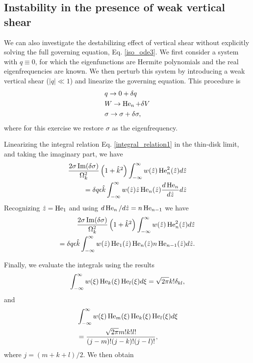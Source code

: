 \subsection{Instability in the presence of weak vertical shear}
We can also investigate the destabilizing effect of vertical shear
without explicitly solving the full governing equation,
Eq. \ref{iso_ode3}. We first
consider a system with $q\equiv0$, for which the eigenfunctions are
Hermite polynomials and the real eigenfrequencies are known. We then
perturb this system by introducing a weak vertical shear ($|q|\ll1$)
and linearize the governing equation. This procedure is
\begin{align}   
  &q \to 0 + \delta q\\
  &W \to \operatorname{He}_n + \delta V \\
  &\sigma \to \sigma + \delta\sigma, 
\end{align}
where for this exercise we restore $\sigma$ as the eigenfrequency. 

Linearizing the integral relation Eq. \ref{integral_relation1} in the
thin-disk limit, and taking the
imaginary part, we have
\begin{align}
  \frac{2\sigma\operatorname{Im}(\delta\sigma)}{\Omega_k^2}
  \left(1+\hat{k}^2\right) \int_{-\infty}^{\infty} w(\hat{z})
  \operatorname{He}_n^2(\hat{z}) d\hat{z} \notag\\
  = \delta q \epsilon \hat{k} 
  \int_{-\infty}^{\infty}
  w(\hat{z})\hat{z}\operatorname{He}_n(\hat{z})\frac{d\operatorname{He}_n}{d\hat{z}} d\hat{z}
\end{align}
Recognizing $\hat{z} = \operatorname{He}_1$ and using $d\operatorname{He}_n/d\hat{z} = n
\operatorname{He}_{n-1}$ we have
 \begin{align}
   \frac{2\sigma\operatorname{Im}(\delta\sigma)}{\Omega_k^2}
   \left(1+\hat{k}^2\right) \int_{-\infty}^{\infty} w(\hat{z})
   \operatorname{He}_n^2(\hat{z}) d\hat{z} \notag\\
   =\delta q \epsilon \hat{k} 
   \int_{-\infty}^{\infty}
   w(\hat{z})\operatorname{He}_1(\hat{z})\operatorname{He}_n(\hat{z})n\operatorname{He}_{n-1}(\hat{z})d\hat{z}. 
 \end{align}

Finally, we evaluate the integrals using the results
\begin{align}
  \int_{-\infty}^{\infty}
  w(\xi) \operatorname{He}_k(\xi)\operatorname{He}_l(\xi) d\xi = \sqrt{2\pi}k!\delta_{kl}, 
\end{align}
and
\begin{align}
  &\int_{-\infty}^{\infty}
  w(\xi) \operatorname{He}_m(\xi)\operatorname{He}_k(\xi)\operatorname{He}_l(\xi) d\xi\notag\\& =
  \frac{\sqrt{2\pi}m!k!l!}{(j-m)!(j-k)!(j-l)!}, 
\end{align}
where $j = (m+k+l)/2$. We then obtain

